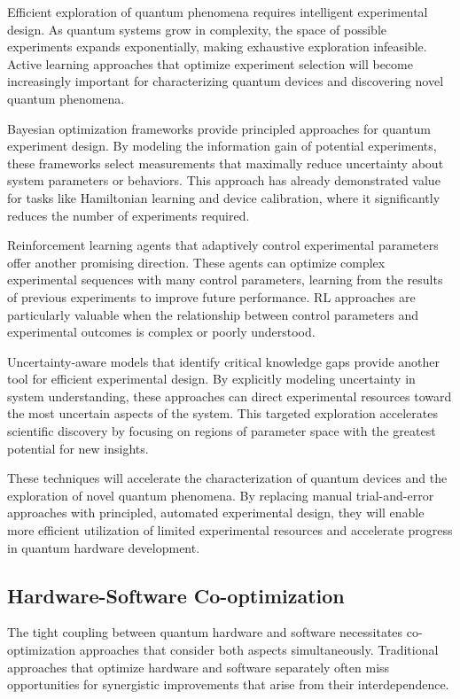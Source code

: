 Efficient exploration of quantum phenomena requires intelligent experimental design. As quantum systems grow in complexity, the space of possible experiments expands exponentially, making exhaustive exploration infeasible. Active learning approaches that optimize experiment selection will become increasingly important for characterizing quantum devices and discovering novel quantum phenomena.

Bayesian optimization frameworks provide principled approaches for quantum experiment design. By modeling the information gain of potential experiments, these frameworks select measurements that maximally reduce uncertainty about system parameters or behaviors. This approach has already demonstrated value for tasks like Hamiltonian learning and device calibration, where it significantly reduces the number of experiments required.

Reinforcement learning agents that adaptively control experimental parameters offer another promising direction. These agents can optimize complex experimental sequences with many control parameters, learning from the results of previous experiments to improve future performance. RL approaches are particularly valuable when the relationship between control parameters and experimental outcomes is complex or poorly understood.

Uncertainty-aware models that identify critical knowledge gaps provide another tool for efficient experimental design. By explicitly modeling uncertainty in system understanding, these approaches can direct experimental resources toward the most uncertain aspects of the system. This targeted exploration accelerates scientific discovery by focusing on regions of parameter space with the greatest potential for new insights.

These techniques will accelerate the characterization of quantum devices and the exploration of novel quantum phenomena. By replacing manual trial-and-error approaches with principled, automated experimental design, they will enable more efficient utilization of limited experimental resources and accelerate progress in quantum hardware development.

\subsection{Hardware-Software Co-optimization}

The tight coupling between quantum hardware and software necessitates co-optimization approaches that consider both aspects simultaneously. Traditional approaches that optimize hardware and software separately often miss opportunities for synergistic improvements that arise from their interdependence.

